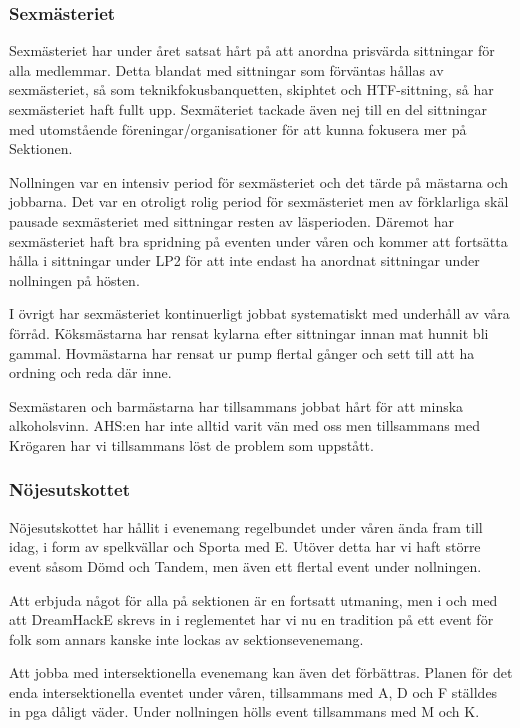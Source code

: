 \documentclass[../_main/handlingar.tex]{subfiles}
\begin{document}
\subsubsection*{Sexmästeriet}

Sexmästeriet har under året satsat hårt på att anordna prisvärda sittningar för alla medlemmar. Detta blandat med sittningar som förväntas hållas av sexmästeriet, så som teknikfokusbanquetten, skiphtet och HTF-sittning, så har sexmästeriet haft fullt upp. Sexmäteriet tackade även nej till en del sittningar med utomstående föreningar/organisationer för att kunna fokusera mer på Sektionen.

Nollningen var en intensiv period för sexmästeriet och det tärde på mästarna och jobbarna. Det var en otroligt rolig period för sexmästeriet men av förklarliga skäl pausade sexmästeriet med sittningar resten av läsperioden. Däremot har sexmästeriet haft bra spridning på eventen under våren och kommer att fortsätta hålla i sittningar under LP2 för att inte endast ha anordnat sittningar under nollningen på hösten. 

I övrigt har sexmästeriet kontinuerligt jobbat systematiskt med underhåll av våra förråd. Köksmästarna har rensat kylarna efter sittningar innan mat hunnit bli gammal. Hovmästarna har rensat ur pump flertal gånger och sett till att ha ordning och reda där inne.

Sexmästaren och barmästarna har tillsammans jobbat hårt för att minska alkoholsvinn. AHS:en har inte alltid varit vän med oss men tillsammans med Krögaren har vi tillsammans löst de problem som uppstått. 

\subsubsection*{Nöjesutskottet}

Nöjesutskottet har hållit i evenemang regelbundet under våren ända fram till idag, i form av spelkvällar och Sporta med E. Utöver detta har vi haft större event såsom Dömd och Tandem, men även ett flertal event under nollningen.   

Att erbjuda något för alla på sektionen är en fortsatt utmaning, men i och med att DreamHackE skrevs in i reglementet har vi nu en tradition på ett event för folk som annars kanske inte lockas av sektionsevenemang. 

Att jobba med intersektionella evenemang kan även det förbättras. Planen för det enda intersektionella eventet under våren, tillsammans med A, D och F ställdes in pga dåligt väder. Under nollningen hölls event tillsammans med M och K. 
\end{document}

